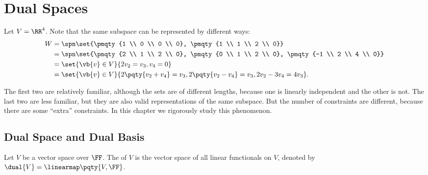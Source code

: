 \section{Dual Spaces}

Let \(V = \RR^4\). Note that the same subspace can be represented by different ways:
\begin{align*}
    W &= \spn\set{\pmqty{1 \\ 0 \\ 0 \\ 0}, \pmqty{1 \\ 1 \\ 2 \\ 0}} \\
    &= \spn\set{\pmqty{2 \\ 1 \\ 2 \\ 0}, \pmqty{0 \\ 1 \\ 2 \\ 0}, \pmqty{-1 \\ 2 \\ 4 \\ 0}} \\
    &= \set{\vb{v} \in V}{2 v_2 = v_3, v_4 = 0} \\
    &= \set{\vb{v} \in V}{2 \pqty{v_2 + v_4} = v_3, 2\pqty{v_2 - v_4} = v_3, 2 v_2 - 3 v_4 = 4 v_3}.
\end{align*}

The first two are relatively familiar, although the sets are of different lengths, because one is linearly independent and the other is not. The last two are less familiar, but they are also valid representations of the same subspace. But the number of constraints are different, because there are some ``extra'' constraints. In this chapter we rigorously study this phenomenon.

\subsection{Dual Space and Dual Basis}

\begin{definition}
    Let \(V\) be a vector space over \(\FF\). The  of \(V\) is the vector space of all linear functionals on \(V\), denoted by \(\dual{V} = \linearmap\pqty{V, \FF}\).
\end{definition}


